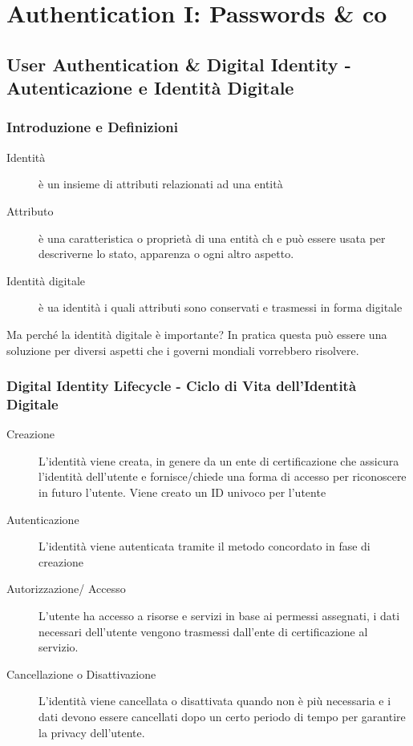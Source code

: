 \chapter{Authentication I: Passwords \& co}
\thispagestyle{chapterInit}
\section{User Authentication \& Digital Identity - Autenticazione e Identità Digitale}
    \label{sec:user-authentication}
    \subsection{Introduzione e Definizioni}
        \begin{description}
            \item[Identità] è un insieme di attributi relazionati ad una entità
            \item[Attributo] è una caratteristica o proprietà di una entità ch e può essere usata per descriverne lo stato, apparenza o ogni altro aspetto.  
            \item[Identità digitale] è ua identità i quali attributi sono conservati e trasmessi in forma digitale 
        \end{description}
        Ma perché la identità digitale è importante? In pratica questa può essere una soluzione per diversi aspetti che i governi mondiali vorrebbero risolvere.
    \subsection{Digital Identity Lifecycle - Ciclo di Vita dell'Identità Digitale}
        \begin{description}
            \item[Creazione] L'identità viene creata, in genere da un ente di certificazione che assicura l'identità dell'utente e fornisce/chiede una forma di accesso per riconoscere in futuro l'utente. Viene creato un ID univoco per l'utente
            \item[Autenticazione] L'identità viene autenticata tramite il metodo concordato in fase di creazione
            \item[Autorizzazione/ Accesso] L'utente ha accesso a risorse e servizi in base ai permessi assegnati, i dati necessari dell'utente vengono trasmessi dall'ente di certificazione al servizio.
            \item[Cancellazione o Disattivazione] L'identità viene cancellata o disattivata quando non è più necessaria e i dati devono essere cancellati dopo un certo periodo di tempo per garantire la privacy dell'utente.
        \end{description}
